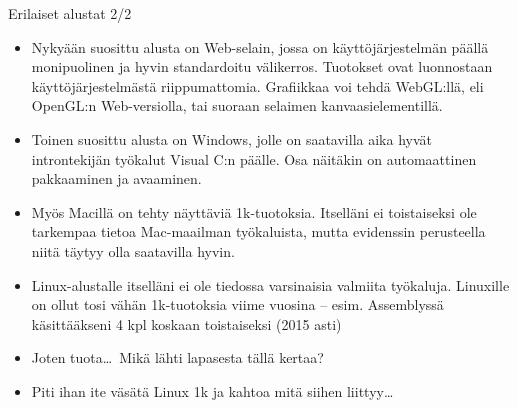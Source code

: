 \documentclass[pdf,10pt,handout]{beamer}
\begin{document}
\begin{frame}{Erilaiset alustat 2/2}
  \begin{itemize}
    \item Nykyään suosittu alusta on Web-selain, jossa on
      käyttöjärjestelmän päällä monipuolinen ja hyvin standardoitu
      välikerros. Tuotokset ovat luonnostaan käyttöjärjestelmästä
      riippumattomia. Grafiikkaa voi tehdä WebGL:llä, eli OpenGL:n
      Web-versiolla, tai suoraan selaimen kanvaasielementillä.
    \item Toinen suosittu alusta on Windows, jolle on saatavilla aika
      hyvät introntekijän työkalut Visual C:n päälle. Osa näitäkin on
      automaattinen pakkaaminen ja avaaminen.
    \item Myös Macillä on tehty näyttäviä 1k-tuotoksia. Itselläni ei
      toistaiseksi ole tarkempaa tietoa Mac-maailman työkaluista,
      mutta evidenssin perusteella niitä täytyy olla saatavilla hyvin.
    \item Linux-alustalle itselläni ei ole tiedossa varsinaisia
      valmiita työkaluja. Linuxille on ollut tosi vähän 1k-tuotoksia
      viime vuosina -- esim. Assemblyssä käsittääkseni 4 kpl koskaan
      toistaiseksi (2015 asti)
    \item Joten tuota\ldots\ Mikä lähti lapasesta tällä kertaa?
    \item Piti ihan ite väsätä Linux 1k ja kahtoa mitä siihen
      liittyy\ldots
  \end{itemize}
\end{frame}
\end{document}
